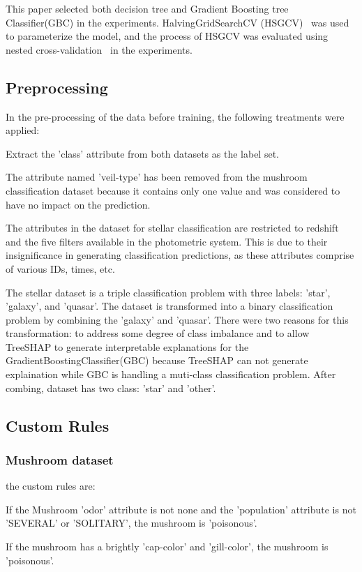 \documentclass[runningheads,a4paper]{llncs}
\begin{document}
This paper selected both decision tree and Gradient Boosting tree Classifier(GBC) in the experiments. HalvingGridSearchCV (HSGCV)~\cite{pmlr-v51-jamieson16} was used to parameterize the model, and the process of HSGCV was evaluated using nested cross-validation~\cite{https://doi.org/10.1111/j.2517-6161.1974.tb00994.x} in the experiments.

\subsection{Preprocessing}
In the pre-processing of the data before training, the following treatments were applied:

Extract the 'class' attribute from both datasets as the label set.

The attribute named 'veil-type' has been removed from the mushroom  classification dataset because it contains only one value and was considered to have no impact on the prediction.

The attributes in the dataset for stellar classification are restricted to redshift and the five filters available in the photometric system. This is due to their insignificance in generating classification predictions, as these attributes comprise of various IDs, times, etc.

The stellar dataset is a triple classification problem with three labels: 'star', 'galaxy', and 'quasar'. 
The dataset is transformed into a binary classification problem by combining the 'galaxy' and 'quasar'. 
There were two reasons for this transformation: to address some degree of class imbalance and to allow TreeSHAP to generate interpretable explanations for the GradientBoostingClassifier(GBC) because TreeSHAP can not generate explaination while GBC is  handling a muti-class classification problem.
After combing, dataset has two class: 'star' and 'other'.
\subsection{Custom Rules}
\subsubsection{Mushroom dataset} 

the custom rules are:

If the Mushroom 'odor' attribute is not none and the 'population' attribute is not 'SEVERAL' or 'SOLITARY', the mushroom is 'poisonous'.

If the mushroom has a brightly 'cap-color' and 'gill-color', the mushroom is 'poisonous'.
\end{document}
